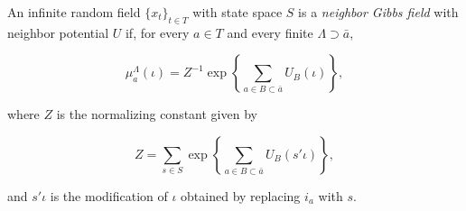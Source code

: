 An infinite random field $\{x_t\}_{t \in T}$ with state space $S$ is a \emph{neighbor Gibbs field} with neighbor potential $U$ if, for every $a \in T$ and every finite $\Lambda \supset \bar{a}$,

$$
\mu_a^{\Lambda}(\iota) = Z^{-1} \exp\left\{ \sum_{a \in B \subset \bar{a}} U_B(\iota) \right\},
$$

where $Z$ is the normalizing constant given by

$$
Z = \sum_{s \in S} \exp\left\{ \sum_{a \in B \subset \bar{a}} U_B(s' \iota) \right\},
$$

and $s' \iota$ is the modification of $\iota$ obtained by replacing $i_a$ with $s$.
